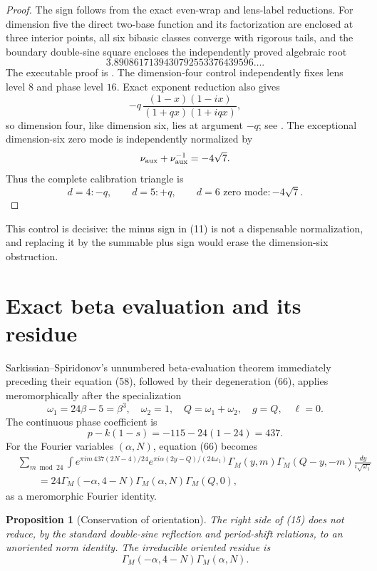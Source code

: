 \documentclass[11pt]{article}
\newtheorem{proposition}[theorem]{Proposition}
\begin{document}
\begin{proof}
The sign follows from the exact even-wrap and lens-label reductions.
For dimension five the direct two-base function and its factorization
are enclosed at three interior points, all six bibasic classes
converge with rigorous tails, and the boundary double-sine square
encloses the independently proved algebraic root
\[
 3.8908617139430792553376439596\ldots.
\]
The executable proof is
.  The
dimension-four control independently fixes lens level $8$ and phase
level $16$.  Exact exponent reduction also gives
\[
 -q\,\frac{(1-x)(1-ix)}{(1+qx)(1+iqx)},
\]
so dimension four, like dimension six, lies at argument $-q$; see
.
The exceptional dimension-six zero mode is independently normalized by
\[
 \nu_{\rm aux}+\nu_{\rm aux}^{-1}=-4\sqrt7.
\]
Thus the complete calibration triangle is
\[
 d=4:-q,\qquad d=5:+q,\qquad
 d=6\text{ zero mode}:-4\sqrt7.
\]
\end{proof}

This control is decisive: the minus sign in (11) is not a dispensable
normalization, and replacing it by the summable plus sign would erase
the dimension-six obstruction.

\section{Exact beta evaluation and its residue}

Sarkissian--Spiridonov's unnumbered beta-evaluation theorem immediately
preceding their equation (58), followed by their degeneration (66),
applies meromorphically after the specialization
\[
 \omega_1=24\beta-5=\beta^3,\quad
 \omega_2=1,\quad Q=\omega_1+\omega_2,\quad
 g=Q,\quad \ell=0.
\tag{14}
\]
The continuous phase coefficient is
\[
 p-k(1-s)=-115-24(1-24)=437.
\tag{15}
\]
For the Fourier variables $(\alpha,N)$, equation (66) becomes
\[
\begin{split}
 &\sum_{m\bmod24}\int
 e^{\pi i m\,437(2N-4)/24}
 e^{\pi i\alpha(2y-Q)/(24\omega_1)}
 \Gamma_M(y,m)\Gamma_M(Q-y,-m)
 \frac{dy}{i\sqrt{\omega_1}}\\
 &\qquad =
 24\Gamma_M(-\alpha,4-N)
 \Gamma_M(\alpha,N)\Gamma_M(Q,0),
\end{split}
\tag{16}
\]
as a meromorphic Fourier identity.

\begin{proposition}[Conservation of orientation]\label{prop:residue}
The right side of (15) does not reduce, by the standard double-sine
reflection and period-shift relations, to an unoriented norm identity.
The irreducible oriented residue is
\[
 \Gamma_M(-\alpha,4-N)\Gamma_M(\alpha,N).
\tag{17}
\]
\end{proposition}
\end{document}
